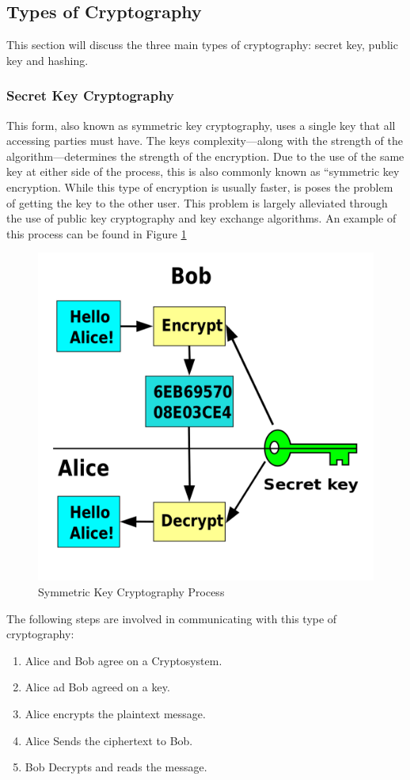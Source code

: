 		\subsection{Types of Cryptography}
			This section will discuss the three main types of cryptography: secret key, public key and hashing.
			\subsubsection{Secret Key Cryptography}
				This form, also known as symmetric key cryptography,  uses a single key that all accessing parties must have.
				The keys complexity---along with the strength of the algorithm---determines the strength of the encryption.
				Due to the use of the same key at either side of the process, this is also commonly known as ``symmetric key encryption.
				While this type of encryption is usually faster, is poses the problem of getting the key to the other user.
				This problem is largely alleviated through the use of public key cryptography and key exchange algorithms.
				An example of this process can be found in Figure \ref{fig:SymmetricKey}
				\begin{figure}[htb]
					\centering
					\includegraphics[scale=0.25]{./SymmetricKey.png}
					\caption{Symmetric Key Cryptography Process}
					\label{fig:SymmetricKey}
				\end{figure}
				The following steps are involved in communicating with this type of cryptography:
				\begin{enumerate}
					\item Alice and Bob agree on a Cryptosystem.
					\item Alice ad Bob agreed on a key.
					\item Alice encrypts the plaintext message.
					\item Alice Sends the ciphertext to Bob.
					\item Bob Decrypts and reads the message.
				\end{enumerate}

